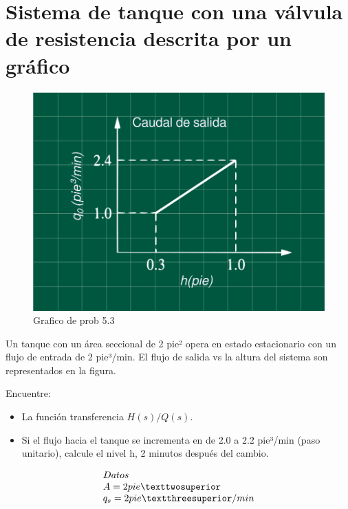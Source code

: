 \documentclass[
  letterpaper,
  DIV=11,
  numbers=noendperiod]{scrreprt}
\begin{document}
\hypertarget{sistema-de-tanque-con-una-vuxe1lvula-de-resistencia-descrita-por-un-gruxe1fico}{%
\chapter{Sistema de tanque con una válvula de resistencia descrita por
un
gráfico}\label{sistema-de-tanque-con-una-vuxe1lvula-de-resistencia-descrita-por-un-gruxe1fico}}

\begin{figure}

{\centering \includegraphics{././images/p5.3-coughanowr/headercontrol.png}

}

\caption{Grafico de prob 5.3}

\end{figure}

Un tanque con un área seccional de 2 pie² opera en estado estacionario
con un flujo de entrada de 2 pie³/min. El flujo de salida vs la altura
del sistema son representados en la figura.

Encuentre:

\begin{itemize}
\item
  La función transferencia \(H(s)/Q(s)\).
\item
  Si el flujo hacia el tanque se incrementa en de 2.0 a 2.2 pie³/min
  (paso unitario), calcule el nivel h, 2 minutos después del cambio.
\end{itemize}

\[
\begin{array}{l}
Datos\\
A = 2\space pie²\\
q_s = 2\space pie³/min
\end{array}
\]
\end{document}
